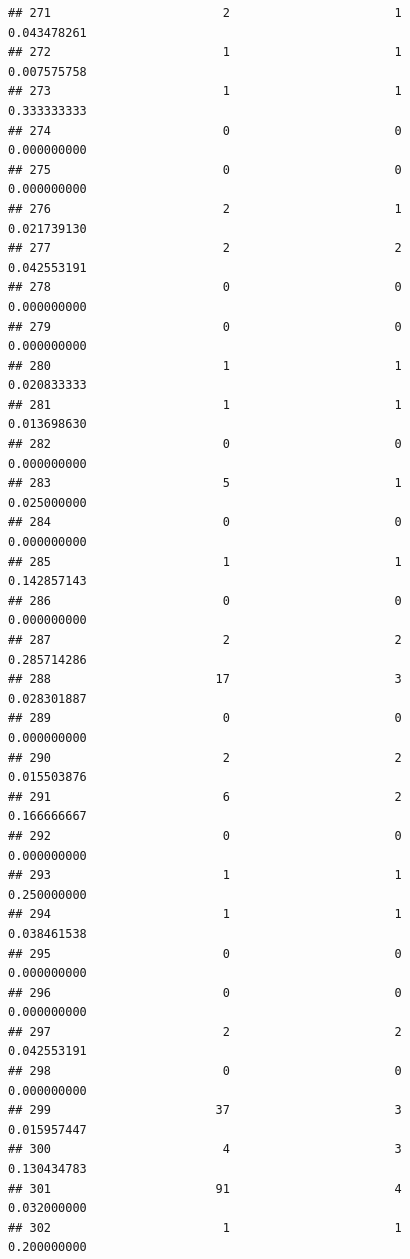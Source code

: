 \documentclass[
]{article}
\begin{document}
\begin{verbatim}
## 271                        2                       1               0.043478261
## 272                        1                       1               0.007575758
## 273                        1                       1               0.333333333
## 274                        0                       0               0.000000000
## 275                        0                       0               0.000000000
## 276                        2                       1               0.021739130
## 277                        2                       2               0.042553191
## 278                        0                       0               0.000000000
## 279                        0                       0               0.000000000
## 280                        1                       1               0.020833333
## 281                        1                       1               0.013698630
## 282                        0                       0               0.000000000
## 283                        5                       1               0.025000000
## 284                        0                       0               0.000000000
## 285                        1                       1               0.142857143
## 286                        0                       0               0.000000000
## 287                        2                       2               0.285714286
## 288                       17                       3               0.028301887
## 289                        0                       0               0.000000000
## 290                        2                       2               0.015503876
## 291                        6                       2               0.166666667
## 292                        0                       0               0.000000000
## 293                        1                       1               0.250000000
## 294                        1                       1               0.038461538
## 295                        0                       0               0.000000000
## 296                        0                       0               0.000000000
## 297                        2                       2               0.042553191
## 298                        0                       0               0.000000000
## 299                       37                       3               0.015957447
## 300                        4                       3               0.130434783
## 301                       91                       4               0.032000000
## 302                        1                       1               0.200000000

\end{verbatim}
\end{document}
